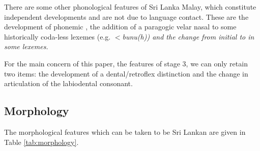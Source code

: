 There are some other phonological features of Sri Lanka Malay, which constitute independent developments and are not due to language contact.  These are the development of phonemic \phonem{\unJ}, the addition of a paragogic velar nasal to some historically coda-less lexemes (e.g. $<$\em bunu(h)\em) and  the change from initial   to  in some lexemes.

For the main concern of this paper, the features of stage 3, we can only retain two items: the development of a dental/retroflex distinction and the change in articulation of the labiodental consonant.

   
\subsection{Morphology}
The morphological features which can be taken to be Sri Lankan are given in Table \ref{tab:morphology}.

